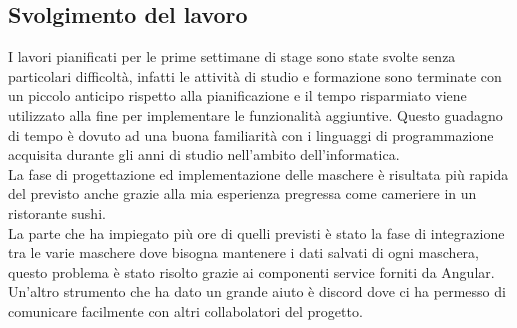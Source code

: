 \subsection{Svolgimento del lavoro}
I lavori pianificati per le prime settimane di stage sono state svolte senza particolari difficoltà, infatti le attività di studio e formazione sono terminate con un piccolo anticipo rispetto alla pianificazione e il tempo risparmiato viene utilizzato alla fine per implementare le funzionalità aggiuntive. Questo guadagno di tempo è dovuto ad una buona familiarità con i linguaggi di programmazione acquisita durante gli anni di studio nell'ambito dell'informatica.\\
La fase di progettazione ed implementazione delle maschere è risultata più rapida del previsto anche grazie alla mia esperienza pregressa come cameriere in un ristorante sushi.\\
La parte che ha impiegato più ore di quelli previsti è stato la fase di integrazione tra le varie maschere dove bisogna mantenere i dati salvati di ogni maschera, questo problema è stato risolto grazie ai componenti service forniti da Angular. Un'altro strumento che ha dato un grande aiuto è discord dove ci ha permesso di comunicare facilmente con altri collabolatori del progetto.\\

